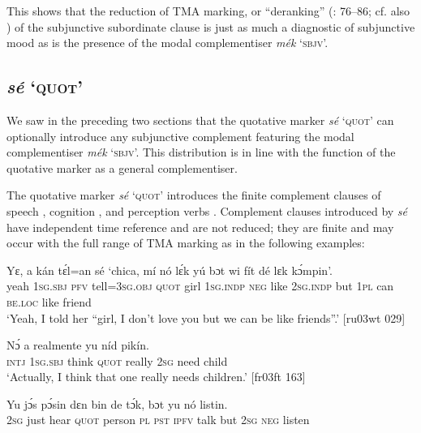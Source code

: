 This shows that the reduction of TMA marking, or “deranking” (\citealt{Stassen1985}: 76–86; cf. also \citealt{Cristofaro2003}) of the subjunctive subordinate clause is just as much a diagnostic of subjunctive mood as is the presence of the modal complementiser \textit{mék} ‘\textsc{sbjv}’. 


\subsection{\textit{sé} ‘\textsc{quot}’}\label{sec:10.5.6}

We saw in the preceding two sections that the quotative marker \textit{sé} ‘\textsc{quot}’ can optionally introduce any subjunctive complement featuring the modal complementiser \textit{mék} ‘\textsc{sbjv}’. This distribution is in line with the function of the quotative marker as a general complementiser. 


The quotative marker \textit{sé} ‘\textsc{quot}’ introduces the finite complement clauses of speech , cognition , and perception verbs . Complement clauses introduced by \textit{sé} have independent time reference and are not reduced; they are finite and may occur with the full range of \textsc{TMA} marking as in the following examples: 



\ea%
    \label{ex:key:1405}
    \gll Yɛ,    a    kán  tɛ́l=an    sé    ‘chica,  mí    nó  lɛ́k  yú
bɔt  wi  fít  dé    lɛk  kɔ́mpin’.\\
yeah  \textsc{1sg.sbj}  \textsc{pfv}  tell=\textsc{3sg.obj}  \textsc{quot}    girl    \textsc{1sg.indp}  \textsc{neg}  like  \textsc{2sg.indp}
but  \textsc{1pl}  can  \textsc{be.loc}  like  friend\\

\glt ‘Yeah, I told her “girl, I don’t love you but we can be like friends”.’ [ru03wt 029]
\z


\ea%
    \label{ex:key:1406}
    \gll Nɔ́  a            realmente  yu  níd    pikín.\\
\textsc{intj}  \textsc{1sg.sbj}  think  \textsc{quot}    really    \textsc{2sg}  need  child\\

\glt ‘Actually, I think that one really needs children.’ [fr03ft 163]
\z


\ea%
    \label{ex:key:1407}
    \gll Yu  jɔ́s          pɔ́sin  dɛn  bin  de  tɔ́k,  bɔt  yu  nó  listin.\\
\textsc{2sg}  just  hear    \textsc{quot}    person  \textsc{pl}  \textsc{pst}  \textsc{ipfv}  talk  but  \textsc{2sg}  \textsc{neg}  listen\\

